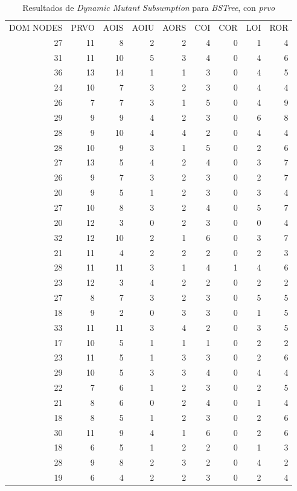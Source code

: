 \begin{table}[]
	\caption{Resultados de \emph{Dynamic Mutant Subsumption} para \emph{BSTree}, con \emph{prvo}}
	\label{tables.results.subsumption.bstree.prvo}
	\centering
	\scriptsize
	\def\arraystretch{0.95}
	\setlength\tabcolsep{0.5mm}
	\begin{tabular}{rrrrrrrrr}
		DOM NODES & PRVO & AOIS & AOIU & AORS & COI & COR & LOI & ROR \\
		27 & 11 & 8 & 2 & 2 & 4 & 0 & 1 & 4 \\
		31 & 11 & 10 & 5 & 3 & 4 & 0 & 4 & 6 \\
		36 & 13 & 14 & 1 & 1 & 3 & 0 & 4 & 5 \\
		24 & 10 & 7 & 3 & 2 & 3 & 0 & 4 & 4 \\
		26 & 7 & 7 & 3 & 1 & 5 & 0 & 4 & 9 \\
		29 & 9 & 9 & 4 & 2 & 3 & 0 & 6 & 8 \\
		28 & 9 & 10 & 4 & 4 & 2 & 0 & 4 & 4 \\
		28 & 10 & 9 & 3 & 1 & 5 & 0 & 2 & 6 \\
		27 & 13 & 5 & 4 & 2 & 4 & 0 & 3 & 7 \\
		26 & 9 & 7 & 3 & 2 & 3 & 0 & 2 & 7 \\
		20 & 9 & 5 & 1 & 2 & 3 & 0 & 3 & 4 \\
		27 & 10 & 8 & 3 & 2 & 4 & 0 & 5 & 7 \\
		20 & 12 & 3 & 0 & 2 & 3 & 0 & 0 & 4 \\
		32 & 12 & 10 & 2 & 1 & 6 & 0 & 3 & 7 \\
		21 & 11 & 4 & 2 & 2 & 2 & 0 & 2 & 3 \\
		28 & 11 & 11 & 3 & 1 & 4 & 1 & 4 & 6 \\
		23 & 12 & 3 & 4 & 2 & 2 & 0 & 2 & 2 \\
		27 & 8 & 7 & 3 & 2 & 3 & 0 & 5 & 5 \\
		18 & 9 & 2 & 0 & 3 & 3 & 0 & 1 & 5 \\
		33 & 11 & 11 & 3 & 4 & 2 & 0 & 3 & 5 \\
		17 & 10 & 5 & 1 & 1 & 1 & 0 & 2 & 2 \\
		23 & 11 & 5 & 1 & 3 & 3 & 0 & 2 & 6 \\
		29 & 10 & 5 & 3 & 3 & 4 & 0 & 4 & 4 \\
		22 & 7 & 6 & 1 & 2 & 3 & 0 & 2 & 5 \\
		21 & 8 & 6 & 0 & 2 & 4 & 0 & 1 & 4 \\
		18 & 8 & 5 & 1 & 2 & 3 & 0 & 2 & 6 \\
		30 & 11 & 9 & 4 & 1 & 6 & 0 & 2 & 6 \\
		18 & 6 & 5 & 1 & 2 & 2 & 0 & 1 & 3 \\
		28 & 9 & 8 & 2 & 3 & 2 & 0 & 4 & 2 \\
		19 & 6 & 4 & 2 & 2 & 3 & 0 & 2 & 4
	\end{tabular}
\end{table}

